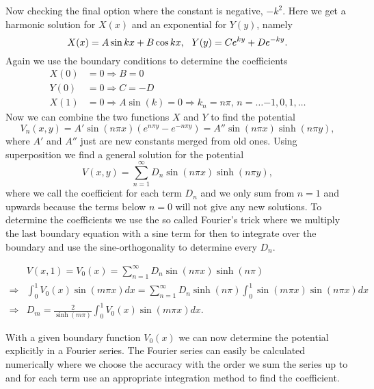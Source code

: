 \documentclass{article}
\begin{document}
Now checking the final option where the constant is negative, $-k^2$. Here we get a harmonic solution for $X(x)$ and an exponential for $Y(y)$, namely
\begin{equation}
    X(x) = A\sin{k x} + B\cos{k x} \text{,}\hspace{3mm} Y(y)=Ce^{k y}+D e^{-k y}.
\end{equation}
Again we use the boundary conditions to determine the coefficients
\begin{equation}
\begin{split}
    X(0)&=0 \Rightarrow B=0 \\
    Y(0)&=0 \Rightarrow C=-D \\
    X(1)&=0 \Rightarrow A\sin{(k)}=0 \Rightarrow k_n=n\pi \text{,  } n=\dots {-1},0,1,\dots
\end{split}
\end{equation}
Now we can combine the two functions $X$ and $Y$ to find the potential
\begin{equation}
    V_n(x,y) =  A' \sin{(n\pi x)}(e^{n\pi y}-e^{-n\pi y}) = A'' \sin{(n\pi x)} \sinh{(n\pi y)},
\end{equation}
where $A'$ and $A''$ just are new constants merged from old ones. Using superposition we find a general solution for the potential 
\begin{equation}
\label{General solution}
    V(x,y) = \sum_{n=1}^{\infty} D_n \sin{(n\pi x)} \sinh{(n \pi y)},
\end{equation}
where we call the coefficient for each term $D_n$ and we only sum from $n=1$ and upwards because the terms below $n=0$ will not give any new solutions. To determine the coefficients we use the so called Fourier's trick where we multiply the last boundary equation with a sine term for then to integrate over the boundary and use the sine-orthogonality to determine every $D_n$.

\begin{equation}
\begin{split}
\label{coefficients}
&V(x,1) = V_0(x)  = \sum_{n=1}^{\infty} D_n \sin{(n\pi x)} \sinh{(n \pi)} \\
\Rightarrow &\int_0^1 V_0(x) \sin{(m\pi x)} dx = \sum_{n=1}^{\infty} D_n \sinh{(n\pi)}\int_0^1 \sin{(m\pi x)} \sin{(n\pi x)} dx \\
\Rightarrow &D_m = \frac{2}{\sinh{(m\pi)}} \int_0^1 V_0(x) \sin{(m\pi x)}dx.
\end{split}
\end{equation}

With a given boundary function $V_0(x)$ we can now determine the potential explicitly in a Fourier series. The Fourier series can easily be calculated numerically where we choose the accuracy with the order we sum the series up to and for each term use an appropriate integration method to find the coefficient.  
\end{document}
